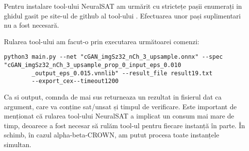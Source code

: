 \hspace{0.5 cm}
Pentru instalare tool-ului NeuralSAT am urmărit cu strictețe pașii enumerați in ghidul gasit pe site-ul de github al tool-ului \cite{read_neuralsat.md}. Efectuarea unor pași suplimentari nu a fost necesară.

Rularea tool-ului am facut-o prin executarea următoarei comenzi:
    \begin{lstlisting}[style=bashstyle]
    python3 main.py --net "cGAN_imgSz32_nCh_3_upsample.onnx" --spec "cGAN_imgSz32_nCh_3_upsample_prop_0_input_eps_0.010
        _output_eps_0.015.vnnlib" --result_file result19.txt 
        --export_cex--timeout1200
   \end{lstlisting}
Ca si output, comnda de mai sus returneaza un rezultat in fisierul dat ca argument, care va conține sat/unsat și timpul de verificare.
Este important de menționat că rularea tool-ului NeuralSAT a implicat un consum mai mare de timp, deoarece a fost necesar să rulăm tool-ul pentru fiecare instanță în parte. În schimb, în cazul alpha-beta-CROWN, am putut procesa toate instanțele simultan. 
